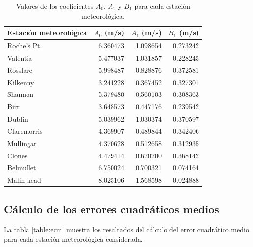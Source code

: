 \documentclass[journal, monochrome]{IEEEtran}
\begin{document}
\begin{table}
	\begin{center}
		\begin{tabular}{l|r|r|r}
			Estación meteorológica & $A_{0}$ (m/s) & $A_{1}$ (m/s) & $B_{1}$ (m/s) \\
			\hline
			Roche's Pt. & 6.360473 & 1.098654 & 0.273242\\ 
			Valentia & 5.477037 & 1.031857 & 0.228245 \\
			Rosslare & 5.998487 & 0.828876 & 0.372581 \\
			Kilkenny & 3.244228 & 0.367452 & 0.327301 \\
			Shannon & 5.379480 & 0.560103 & 0.308363 \\
			Birr & 3.648573 & 0.447176 & 0.239542 \\
			Dublin & 5.039962 & 1.030374 & 0.370597 \\
			Claremorris & 4.369907 & 0.489844 & 0.342406 \\
			Mullingar & 4.370628 & 0.512658 & 0.312935 \\
			Clones & 4.479414 & 0.620200 & 0.368142 \\
			Belmullet & 6.750024 & 0.700321 & 0.074164 \\
			Malin head & 8.025106 & 1.568598 & 0.024888 \\
		\end{tabular}
		\caption{Valores de los coeficientes $A_{0}$, $A_{1}$ y $B_{1}$ para cada estación meteorológica.}
		\label{table:ls}
	\end{center}
\end{table}

\vspace{0.5cm}
\subsection{Cálculo de los errores cuadráticos medios}
\par
La tabla \ref{table:ecm} muestra los resultados del cálculo del error cuadrático medio para cada estación meteorológica considerada.
\end{document}
